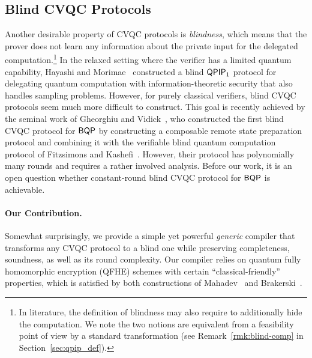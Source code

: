 







\subsection{Blind CVQC Protocols} \label{subsection:blind}



Another desirable property of CVQC protocols is  \emph{blindness}, which means that the prover does not learn any information about the private input for the delegated computation.\footnote{In literature, the definition of blindness may also require to additionally hide the computation. We note the two notions are equivalent from a feasibility point of view by a standard transformation (see Remark~\ref{rmk:blind-comp} in Section~\ref{sec:qpip_def}). 
} In the relaxed setting where the verifier has a limited quantum capability, Hayashi and Morimae~\cite{hayashi2015verifiable} constructed a blind $\operatorname{\mathsf{QPIP}}_1$ protocol for delegating quantum computation with information-theoretic security that also handles sampling problems. 
%
However, for purely classical verifiers, blind CVQC protocols seem much more difficult to construct. This goal is recently achieved by the seminal work of Gheorghiu and Vidick~\cite{FOCS:GheVid19}, who constructed the first blind CVQC protocol for $\operatorname{\mathsf{BQP}}$ by constructing a composable remote state preparation protocol and combining it with the verifiable blind quantum computation protocol of Fitzsimons and Kashefi~\cite{FK17}. However, their protocol has   polynomially many rounds  and requires a rather involved analysis. Before our work, it is an open question whether constant-round blind CVQC protocol for $\operatorname{\mathsf{BQP}}$ is achievable.

\paragraph{Our Contribution.} Somewhat surprisingly, we provide a simple yet powerful  
\emph{generic}  compiler that transforms any CVQC protocol to a blind one while preserving completeness, soundness, as well as its round complexity. 
Our compiler relies on quantum fully homomorphic encryption (QFHE) schemes with certain ``classical-friendly'' properties, which is satisfied by both constructions of Mahadev~\cite{mahadev_qfhe} and Brakerski~\cite{brakerski_qfhe}.

